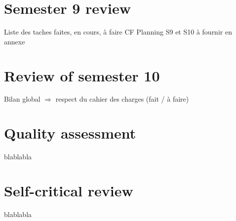 \documentclass{polytech/polytech}
\numberwithin{figure}{chapter}
\begin{document}
\section{Semester 9 review}

Liste des taches faites, en cours, à faire
CF Planning S9 et S10 à fournir en annexe

\section{Review of semester 10}

Bilan global $\Rightarrow$ respect du cahier des charges (fait / à faire)

\section{Quality assessment}
blablabla

\section{Self-critical review}
blablabla
\end{document}
